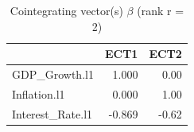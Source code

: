 \begin{table}

\caption{\label{tab:vecm-loadings}Cointegrating vector(s) $\beta$  (rank r = 2)}
\centering
\begin{tabular}[t]{lrr}
\toprule
  & ECT1 & ECT2\\
\midrule
GDP\_Growth.l1 & 1.000 & 0.00\\
Inflation.l1 & 0.000 & 1.00\\
Interest\_Rate.l1 & -0.869 & -0.62\\
\bottomrule
\end{tabular}
\end{table}
